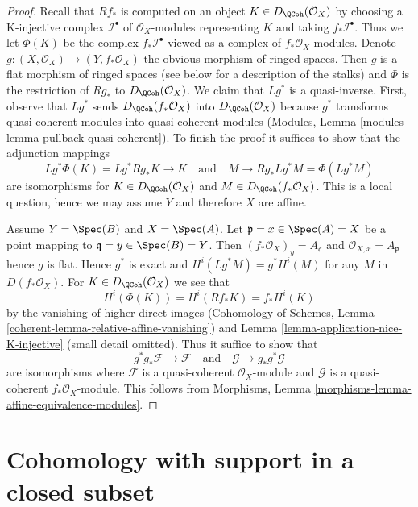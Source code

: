 \begin{proof}
Recall that $Rf_*$ is computed on an object $K \in D_\QCoh(\mathcal{O}_X)$
by choosing a K-injective complex $\mathcal{I}^\bullet$ of
$\mathcal{O}_X$-modules representing $K$ and taking $f_*\mathcal{I}^\bullet$.
Thus we let $\Phi(K)$ be the complex $f_*\mathcal{I}^\bullet$
viewed as a complex of $f_*\mathcal{O}_X$-modules.
Denote $g : (X, \mathcal{O}_X) \to (Y, f_*\mathcal{O}_X)$ the
obvious morphism of ringed spaces. Then $g$ is a flat morphism of
ringed spaces (see below for a description of the stalks) and
$\Phi$ is the restriction of $Rg_*$ to $D_\QCoh(\mathcal{O}_X)$.
We claim that $Lg^*$ is a quasi-inverse. First, observe that
$Lg^*$ sends $D_\QCoh(f_*\mathcal{O}_X)$ into $D_\QCoh(\mathcal{O}_X)$
because $g^*$ transforms quasi-coherent modules into quasi-coherent
modules (Modules, Lemma \ref{modules-lemma-pullback-quasi-coherent}).
To finish the proof it suffices to show that
the adjunction mappings
$$
Lg^*\Phi(K) = Lg^*Rg_*K \to K
\quad\text{and}\quad
M \to Rg_*Lg^*M = \Phi(Lg^*M)
$$
are isomorphisms for $K \in D_\QCoh(\mathcal{O}_X)$ and
$M \in D_\QCoh(f_*\mathcal{O}_X)$. This is a local question, hence
we may assume $Y$ and therefore $X$ are affine.

\medskip\noindent
Assume $Y = \Spec(B)$ and $X = \Spec(A)$. Let
$\mathfrak p = x \in \Spec(A) = X$ be a point mapping to
$\mathfrak q = y \in \Spec(B) = Y$. Then
$(f_*\mathcal{O}_X)_y = A_\mathfrak q$ and $\mathcal{O}_{X, x} = A_\mathfrak p$
hence $g$ is flat. Hence $g^*$ is exact and $H^i(Lg^*M) = g^*H^i(M)$
for any $M$ in $D(f_*\mathcal{O}_X)$.
For $K \in D_\QCoh(\mathcal{O}_X)$ we see that
$$
H^i(\Phi(K)) = H^i(Rf_*K) = f_*H^i(K)
$$
by the vanishing of higher direct images
(Cohomology of Schemes, Lemma \ref{coherent-lemma-relative-affine-vanishing})
and Lemma \ref{lemma-application-nice-K-injective} (small detail omitted).
Thus it suffice to show that
$$
g^*g_*\mathcal{F} \to \mathcal{F}
\quad\text{and}\quad
\mathcal{G} \to g_*g^*\mathcal{G}
$$
are isomorphisms where $\mathcal{F}$ is
a quasi-coherent $\mathcal{O}_X$-module and $\mathcal{G}$ is
a quasi-coherent $f_*\mathcal{O}_X$-module. This follows from
Morphisms, Lemma \ref{morphisms-lemma-affine-equivalence-modules}.
\end{proof}





\section{Cohomology with support in a closed subset}
\label{section-cohomology-support}


